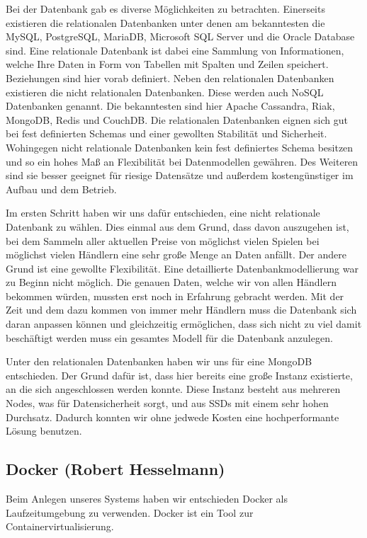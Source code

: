 Bei der Datenbank gab es diverse Möglichkeiten zu betrachten. Einerseits existieren die relationalen Datenbanken unter denen am bekanntesten die MySQL, PostgreSQL, MariaDB, Microsoft SQL Server und die Oracle Database sind. Eine relationale Datenbank ist dabei eine Sammlung von Informationen, welche Ihre Daten in Form von Tabellen mit Spalten und Zeilen speichert. Beziehungen sind hier vorab definiert. Neben den relationalen Datenbanken existieren die nicht relationalen Datenbanken. Diese werden auch NoSQL Datenbanken genannt. Die bekanntesten sind hier Apache Cassandra, Riak, MongoDB, Redis und CouchDB. Die relationalen Datenbanken eignen sich gut bei fest definierten Schemas und einer gewollten Stabilität und Sicherheit. Wohingegen nicht relationale Datenbanken kein fest definiertes Schema besitzen und so ein hohes Maß an Flexibilität bei Datenmodellen gewähren. Des Weiteren sind sie besser geeignet für riesige Datensätze und außerdem kostengünstiger im Aufbau und dem Betrieb. 

Im ersten Schritt haben wir uns dafür entschieden, eine nicht relationale Datenbank zu wählen. Dies einmal aus dem Grund, dass davon auszugehen ist, bei dem Sammeln aller aktuellen Preise von möglichst vielen Spielen bei möglichst vielen Händlern eine sehr große Menge an Daten anfällt. Der andere Grund ist eine gewollte Flexibilität. Eine detaillierte Datenbankmodellierung war zu Beginn nicht möglich. Die genauen Daten, welche wir von allen Händlern bekommen würden, mussten erst noch in Erfahrung gebracht werden. Mit der Zeit und dem dazu kommen von immer mehr Händlern muss die Datenbank sich daran anpassen können und gleichzeitig ermöglichen, dass sich nicht zu viel damit beschäftigt werden muss ein gesamtes Modell für die Datenbank anzulegen.

Unter den relationalen Datenbanken haben wir uns für eine MongoDB entschieden. Der Grund dafür ist, dass hier bereits eine große Instanz existierte, an die sich angeschlossen werden konnte. Diese Instanz besteht aus mehreren Nodes, was für Datensicherheit sorgt, und aus SSDs mit einem sehr hohen Durchsatz. Dadurch konnten wir ohne jedwede Kosten eine hochperformante Lösung benutzen.

\newpage

\subsection*{Docker (Robert Hesselmann)}

Beim Anlegen unseres Systems haben wir entschieden Docker als Laufzeitumgebung zu verwenden. Docker ist ein Tool zur Containervirtualisierung. 

